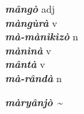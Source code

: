 \begin{multicols}{2}
{{\bfseries\itshape mângò}} \relax  adj  \relax   \relax  {} \relax   \relax  \\
{{\bfseries\itshape màngùrà}} \relax  v  \relax   \relax  {} \relax   \relax  \\
{{\bfseries\itshape mà-mànìkìzò}} \relax  n   \relax  {} \relax   \relax  \\
{{\bfseries\itshape mànìnà}} \relax  v  \relax   \relax  {} \relax   \relax  \\
{{\bfseries\itshape mântà}} \relax  v  \relax   \relax  {} \relax   \relax  \\
{{\bfseries\itshape mà-rândà}} \relax  n   \relax  {} \relax   \relax  \\
{{\bfseries\itshape màryânjò {\textasciitilde}}

}
\end{multicols}
